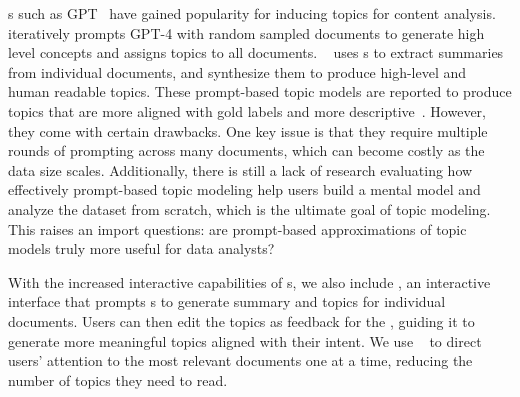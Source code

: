 \mm{}s such as GPT~\cite{openai2024gpt4,touvron2023llama} have gained popularity for inducing topics for content analysis.
%
\topicgpt{}~\cite{pham2024topicgpt} iteratively prompts GPT-4 with random sampled documents to generate high level concepts and assigns topics to all documents. 
%
\lloom{}~\cite{lam2024concept} uses \mm{}s to extract summaries from individual documents, and synthesize them to produce high-level and human readable topics. 
%
These prompt-based topic models are reported to produce topics that are more aligned with gold labels and more descriptive~\cite{lam2024concept}.
%
However, they come with certain drawbacks. %
%
One key issue is that they require multiple rounds of prompting across many documents, which can become costly as the data size scales.
%
Additionally, there is still a lack of research evaluating how effectively prompt-based topic modeling help users build a mental model and analyze the dataset from scratch, which is the ultimate goal of topic modeling. This raises an import questions: are prompt-based approximations of topic models truly more useful for data analysts?


With the increased interactive capabilities of \mm{}s, we also include \bass{}, an interactive interface that prompts \mm{}s to generate summary and topics for individual documents. Users can then edit the topics as feedback for the \mm{}, guiding it to generate more meaningful topics aligned with their intent. 
%
We use ~\cite{alto, li-etal-2024-improving} to direct users' attention to the most relevant documents one at a time, reducing the number of topics they need to read.
%






